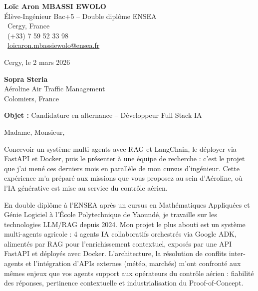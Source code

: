\documentclass[a4paper,11pt]{article}
\begin{document}
\noindent
\begin{minipage}[t]{0.5\textwidth}
    \textbf{Loïc Aron MBASSI EWOLO}\\
    Élève-Ingénieur Bac+5 -- Double diplôme ENSEA\\[3pt]
    \faMapMarker\ Cergy, France\\
    \faPhone\ (+33) 7 59 52 33 98\\
    \faEnvelope\ \href{mailto:loicaron.mbassiewolo@ensea.fr}{loicaron.mbassiewolo@ensea.fr}
\end{minipage}
\hfill
\begin{minipage}[t]{0.4\textwidth}
    \raggedleft
    Cergy, le 2 mars 2026
\end{minipage}

\vspace{1.2cm}

\hfill
\begin{minipage}[t]{0.5\textwidth}
    \raggedleft
    \textbf{Sopra Steria}\\
    Aéroline Air Traffic Management\\
    Colomiers, France
\end{minipage}

\vspace{1cm}

\noindent\textbf{Objet :} Candidature en alternance -- Développeur Full Stack IA

\vspace{0.8cm}

Madame, Monsieur,

Concevoir un système multi-agents avec RAG et LangChain, le déployer via FastAPI et Docker, puis le présenter à une équipe de recherche : c'est le projet que j'ai mené ces derniers mois en parallèle de mon cursus d'ingénieur. Cette expérience m'a préparé aux missions que vous proposez au sein d'Aéroline, où l'IA générative est mise au service du contrôle aérien.

En double diplôme à l'ENSEA après un cursus en Mathématiques Appliquées et Génie Logiciel à l'École Polytechnique de Yaoundé, je travaille sur les technologies LLM/RAG depuis 2024. Mon projet le plus abouti est un système multi-agents agricole : 4 agents IA collaboratifs orchestrés via Google ADK, alimentés par RAG pour l'enrichissement contextuel, exposés par une API FastAPI et déployés avec Docker. L'architecture, la résolution de conflits inter-agents et l'intégration d'APIs externes (météo, marchés) m'ont confronté aux mêmes enjeux que vos agents support aux opérateurs du contrôle aérien : fiabilité des réponses, pertinence contextuelle et industrialisation du Proof-of-Concept.
\end{document}
